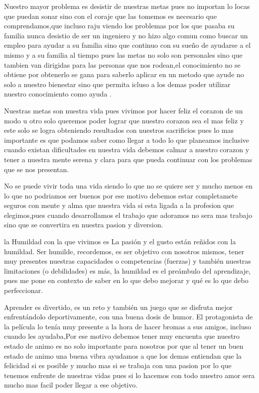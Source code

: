 \documentclass[12pt]{article}
\begin{document}
\vspace{10PT}
Nuestro mayor problema es desistir de nuestras metas pues no importan lo locas que puedan sonar sino con el coraje que las tomemos es necesario que comprendamos,que incluso raju viendo los problemas por los que pasaba su familia nunca desistio de ser un ingeniero y no hizo algo comun como buscar un empleo para ayudar a su familia sino que continuo con su sueño de ayudarse a el mismo y a su familia al tiempo pues las metas no solo son personales sino que tambien van dirigidas para las personas que nos rodean,el conocimiento no se obtiene por obtenerlo se gana para saberlo aplicar en un metodo que ayude no solo a nuestro bienestar sino que permita icluso a los demas poder utilizar nuestro conocimiento como ayuda .

\vspace{15PT}
Nuestras metas son nuestra vida pues vivimos por hacer feliz el corazon de un modo u otro solo queremos poder lograr que nuestro corazon sea el mas feliz y este solo se logra obteniendo resultados con nuestros sacrificios pues lo mas importante es que podamos saber como llegar a todo lo que planeamos inclusive cuando existan dificultades en nuestra vida debemos calmar a nuestro corazon y tener a nuestra mente serena y clara para que pueda continuar con los problemas que se nos presentan.

\vspace{15PT}
No se puede vivir toda una vida siendo lo que no se quiere ser y mucho menos en lo que no podriamos ser buenos por ese motivo debemos estar completamete seguros con mente y alma que nuestra vida si esta ligada a la profesion que elegimos,pues cuando desarrollamos el trabajo que adoramos no sera mas trabajo sino que se convertira en nuestra pasion y diversion.

\vspace{15PT}
la Humildad con la que vivimos es La pasión y el gusto están reñidos con la humildad. Ser humilde, recordemos, es ser objetivo con nosotros mismos, tener muy presentes nuestras capacidades o competencias (fuerzas) y también nuestras limitaciones (o debilidades) es más, la humildad es el preámbulo del aprendizaje, pues me pone en contexto de saber en lo que debo mejorar y qué es lo que debo perfeccionar.

\vspace{15PT}
 Aprender es divertido, es un reto y también un juego que se disfruta mejor enfrentándolo deportivamente, con una buena dosis de humor. El protagonista de la película lo tenía muy presente a la hora de hacer bromas a sus amigos, incluso cuando les ayudaba,Por ese motivo debemos tener muy encuenta que nuestro estado de animo es no solo importante para nosotros por que al tener un buen estado de animo una buena vibra ayudamos a que los demas entiendan que la felicidad si es posible y mucho mas si se trabaja con una pasion por lo que tenemos enfrente de nuestras vidas pues si lo hacemos con todo nuestro amor sera mucho mas facil poder llegar a ese objetivo.
 
\end{document}

